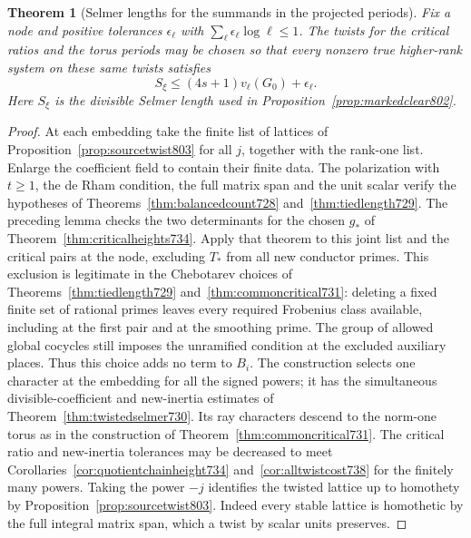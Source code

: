 \documentclass[a4paper,11pt]{article}
\newtheorem{theorem}[proposition]{Theorem}
\theoremstyle{definition}
\theoremstyle{remark}
\numberwithin{equation}{section}
\begin{document}
\begin{theorem}[Selmer lengths for the summands in the projected periods]
\leavevmode\label{thm:actualselmer803}
Fix a node and positive tolerances \(\epsilon_\ell\) with
\(\sum_\ell\epsilon_\ell\log\ell\le1\). The twists for the
critical ratios and the torus periods may be chosen so that
every nonzero true higher-rank system on these same twists satisfies
\[
                 S_\xi\le (4s+1)v_\ell(G_0)+\epsilon_\ell .
\]
Here \(S_\xi\) is the divisible Selmer length used in
Proposition~\ref{prop:markedclear802}.
\end{theorem}
\begin{proof}
At each embedding take the finite list of lattices of
Proposition~\ref{prop:sourcetwist803} for all \(j\), together
with the rank-one list. Enlarge the coefficient field to contain
their finite data. The polarization with \(t\ge1\), the de Rham
condition, the full matrix span and the unit scalar verify the
hypotheses of Theorems~\ref{thm:balancedcount728}
and~\ref{thm:tiedlength729}. The preceding lemma checks the two
determinants for the chosen \(g_*\) of
Theorem~\ref{thm:criticalheights734}. Apply that theorem to this
joint list and the critical pairs at the node, excluding \(T_*\)
from all new conductor primes. This exclusion is legitimate in
the Chebotarev choices of Theorems~\ref{thm:tiedlength729}
and~\ref{thm:commoncritical731}: deleting a fixed finite set
of rational primes leaves every required Frobenius class available,
including at the first pair and at the smoothing prime. The group
of allowed global cocycles still imposes the unramified condition
at the excluded auxiliary places. Thus this choice adds no term
to \(B_i\). The construction selects
one character at the embedding for all the signed powers; it has
the simultaneous divisible-coefficient and new-inertia estimates
of Theorem~\ref{thm:twistedselmer730}. Its ray characters descend
to the norm-one torus as in the construction of
Theorem~\ref{thm:commoncritical731}. The critical ratio and
new-inertia tolerances may be decreased to meet
Corollaries~\ref{cor:quotientchainheight734}
and~\ref{cor:alltwistcost738} for the finitely many powers.
Taking the power \(-j\) identifies the twisted lattice up to
homothety by Proposition~\ref{prop:sourcetwist803}. Indeed every
stable lattice is homothetic by the full integral matrix span,
which a twist by scalar units preserves.


\end{proof}
\end{document}

